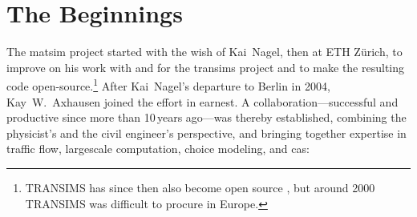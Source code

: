 \section{The Beginnings}
\label{sec:howitstarted}
The \gls{matsim} project \citep[][]{MATSIM_Webpage_2015} started with the wish of Kai~Nagel, then at ETH Zürich, to improve on his work with and for the \gls{transims} project \citep[][]{SmithEtc1995TRANSIMSSeattle,TRANSIMSFHWA_Webpage_2013} and to make the resulting code open-source.\footnote{%
%
TRANSIMS has since then also become open source \citep{TRANSIMSOS_Webpage_2013}, but around 2000 TRANSIMS was difficult to procure in Europe.
%
} After Kai~Nagel's departure to Berlin in 2004, Kay~W.~Axhausen joined the effort in earnest. A collaboration---successful and productive since more than 10\,years ago---was thereby established, combining the physicist's and the civil engineer's perspective, and bringing together expertise in
%
traffic flow,
%
\gls{largescale} computation,
%
choice modeling,
%
and
%
\gls{cas}:
%
%
%
%
%
%
%

